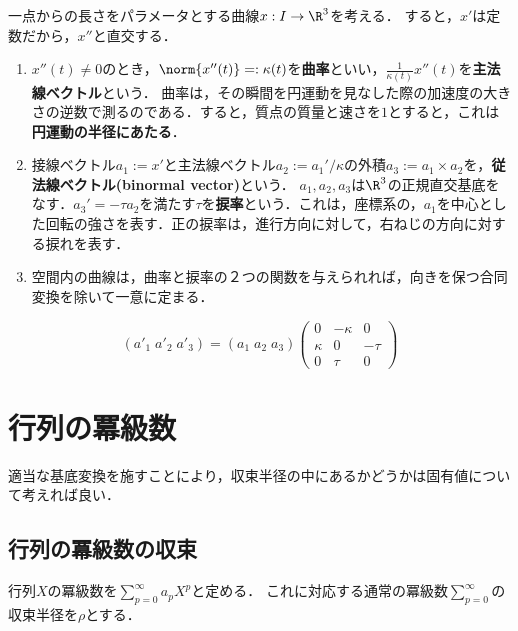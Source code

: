 \documentclass[uplatex, dvipdfmx]{jsreport}
\begin{document}
\begin{example}
    一点からの長さをパラメータとする曲線$x:I\to\R^3$を考える．
    すると，$x'$は定数だから，$x''$と直交する．
    \begin{enumerate}
        \item $x''(t)\ne 0$のとき，$\norm{x''(t)}=:\kappa(t)$を\textbf{曲率}といい，$\frac{1}{\kappa(t)}x''(t)$を\textbf{主法線ベクトル}という．
        曲率は，その瞬間を円運動を見なした際の加速度の大きさの逆数で測るのである．すると，質点の質量と速さを$1$とすると，これは\textbf{円運動の半径にあたる}．
        \item 接線ベクトル$a_1:=x'$と主法線ベクトル$a_2:=a_1'/\kappa$の外積$a_3:=a_1\times a_2$を，\textbf{従法線ベクトル(binormal vector)}という．
        $a_1,a_2,a_3$は$\R^3$の正規直交基底をなす．$a_3'=-\tau a_2$を満たす$\tau$を\textbf{捩率}という．これは，座標系の，$a_1$を中心とした回転の強さを表す．正の捩率は，進行方向に対して，右ねじの方向に対する捩れを表す．
        \item 空間内の曲線は，曲率と捩率の２つの関数を与えられれば，向きを保つ合同変換を除いて一意に定まる．
    \end{enumerate}
\end{example}

\begin{proposition}
    \[(a'_1\;a'_2\;a'_3)=(a_1\;a_2\;a_3)\begin{pmatrix}0&-\kappa&0\\\kappa&0&-\tau\\0&\tau&0\end{pmatrix}\]
\end{proposition}

\section{行列の冪級数}

\begin{tcolorbox}[colframe=ForestGreen, colback=ForestGreen!10!white,breakable,colbacktitle=ForestGreen!40!white,coltitle=black,fonttitle=\bfseries\sffamily,
title=]
    適当な基底変換を施すことにより，収束半径の中にあるかどうかは固有値について考えれば良い．
\end{tcolorbox}

\subsection{行列の冪級数の収束}

\begin{definition}
    行列$X$の冪級数を$\sum_{p=0}^\infty a_pX^p$と定める．
    これに対応する通常の冪級数$\sum^\infty_{p=0}$の収束半径を$\rho$とする．
\end{definition}
\end{document}
